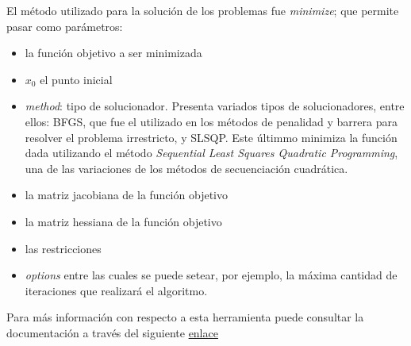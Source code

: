 \documentclass[titlepage, 11pt]{scrartcl}
\begin{document}
	El método utilizado para la solución de los problemas fue \textit{minimize}; que permite pasar como parámetros:
	\begin{itemize}
		\item la función objetivo a ser minimizada
		\item $x_0$ el punto inicial
		\item \textit{method}: tipo de solucionador. Presenta variados tipos de solucionadores, entre ellos: BFGS, que fue el utilizado en los métodos de penalidad y barrera para resolver el problema irrestricto, y SLSQP. Este últimmo minimiza la función dada utilizando el método \textit{Sequential Least Squares Quadratic Programming}, una de las variaciones de los métodos de secuenciación cuadrática.
		\item la matriz jacobiana de la función objetivo
		\item la matriz hessiana de la función objetivo
		\item las restricciones
		\item \textit{options} entre las cuales se puede setear, por ejemplo, la máxima cantidad de iteraciones que realizará el algoritmo.
	\end{itemize}
	Para más información con respecto a esta herramienta puede consultar la documentación a través del siguiente \href{https://docs.scipy.org/doc/scipy/reference/generated/scipy.optimize.minimize.html}{enlace}
	
\end{document}
